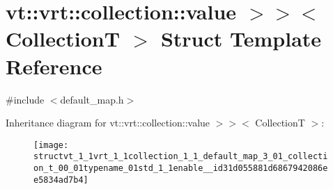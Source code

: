 \hypertarget{structvt_1_1vrt_1_1collection_1_1_default_map_3_01_collection_t_00_01typename_01std_1_1enable__id31d055881d6867942086ee5834ad7b4}{}\section{vt\+:\+:vrt\+:\+:collection\+:\+:value $>$$>$$<$ CollectionT $>$ Struct Template Reference}
\label{structvt_1_1vrt_1_1collection_1_1_default_map_3_01_collection_t_00_01typename_01std_1_1enable__id31d055881d6867942086ee5834ad7b4}


{\ttfamily \#include $<$default\+\_\+map.\+h$>$}

Inheritance diagram for vt\+:\+:vrt\+:\+:collection\+:\+:value $>$$>$$<$ CollectionT $>$\+:\begin{figure}[H]
\begin{center}
\leavevmode
\texttt{[image: structvt\_1\_1vrt\_1\_1collection\_1\_1\_default\_map\_3\_01\_collection\_t\_00\_01typename\_01std\_1\_1enable\_\_id31d055881d6867942086ee5834ad7b4]}
\end{center}
\end{figure}
